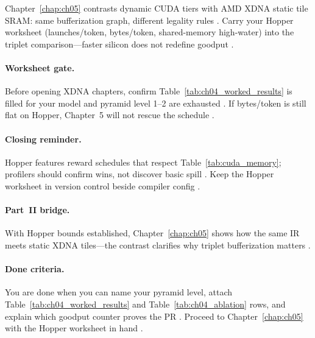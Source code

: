 Chapter~\ref{chap:ch05} contrasts dynamic CUDA tiers with AMD XDNA static tile SRAM: same bufferization graph, different legality rules \citep{amd2024xdna,amd2024aie,patel2025llminference}.
Carry your Hopper worksheet (launches/token, bytes/token, shared-memory high-water) into the triplet comparison---faster silicon does not redefine goodput \citep{taxbreak2026,memoryfloor2026}.

\paragraph{Worksheet gate.}
Before opening XDNA chapters, confirm Table~\ref{tab:ch04_worked_results} is filled for your model and pyramid level 1--2 are exhausted \citep{patel2025llminference,taxbreak2026,memoryfloor2026,yirage2026}.
If bytes/token is still flat on Hopper, Chapter~5 will not rescue the schedule \citep{amd2024xdna,amd2024aie}.

\paragraph{Closing reminder.}
Hopper features reward schedules that respect Table~\ref{tab:cuda_memory}; profilers should confirm wins, not discover basic spill \citep{memoryfloor2026,patel2025llminference,nvidia2022hopper,yirage2026}.
Keep the Hopper worksheet in version control beside compiler config \citep{chen2020compilerbasedhardw,taxbreak2026}.

\paragraph{Part~II bridge.}
With Hopper bounds established, Chapter~\ref{chap:ch05} shows how the same IR meets static XDNA tiles---the contrast clarifies why triplet bufferization matters \citep{amd2024xdna,amd2024aie,yirage2026,patel2025llminference,chen2020compilerbasedhardw}.

\paragraph{Done criteria.}
You are done when you can name your pyramid level, attach Table~\ref{tab:ch04_worked_results} and Table~\ref{tab:ch04_ablation} rows, and explain which goodput counter proves the PR \citep{taxbreak2026,memoryfloor2026,patel2025llminference,yirage2026}.
Proceed to Chapter~\ref{chap:ch05} with the Hopper worksheet in hand \citep{amd2024xdna,amd2024aie,chen2020compilerbasedhardw}.

